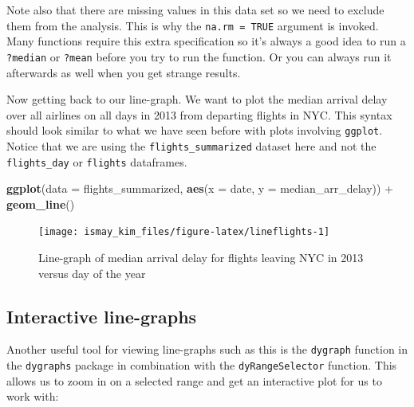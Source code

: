 \documentclass[]{tufte-book}
\newenvironment{Shaded}{\begin{snugshade}}{\end{snugshade}}
\newcommand{\KeywordTok}[1]{\textcolor[rgb]{0.13,0.29,0.53}{\textbf{{#1}}}}
\newcommand{\DataTypeTok}[1]{\textcolor[rgb]{0.13,0.29,0.53}{{#1}}}
\newcommand{\StringTok}[1]{\textcolor[rgb]{0.31,0.60,0.02}{{#1}}}
\newcommand{\NormalTok}[1]{{#1}}
\begin{document}
Note also that there are missing values in this data set so we need to
exclude them from the analysis. This is why the \texttt{na.rm\ =\ TRUE}
argument is invoked. Many functions require this extra specification so
it's always a good idea to run a \texttt{?median} or \texttt{?mean}
before you try to run the function. Or you can always run it afterwards
as well when you get strange results.

Now getting back to our line-graph. We want to plot the median arrival
delay over all airlines on all days in 2013 from departing flights in
NYC. This syntax should look similar to what we have seen before with
plots involving \texttt{ggplot}. Notice that we are using the
\texttt{flights\_summarized} dataset here and not the
\texttt{flights\_day} or \texttt{flights} dataframes.

\begin{Shaded}
\begin{Highlighting}[]
\KeywordTok{ggplot}\NormalTok{(}\DataTypeTok{data =} \NormalTok{flights_summarized, }\KeywordTok{aes}\NormalTok{(}\DataTypeTok{x =} \NormalTok{date, }\DataTypeTok{y =} \NormalTok{median_arr_delay)) +}
\StringTok{  }\KeywordTok{geom_line}\NormalTok{()}
\end{Highlighting}
\end{Shaded}

\begin{figure}
\texttt{[image: ismay\_kim\_files/figure-latex/lineflights-1]} \caption[Line-graph of median arrival delay for flights leaving NYC in 2013 versus day of the year]{Line-graph of median arrival delay for flights leaving NYC in 2013 versus day of the year}\label{fig:lineflights}
\end{figure}

\subsection{Interactive line-graphs}\label{interactive-line-graphs}

Another useful tool for viewing line-graphs such as this is the
\texttt{dygraph} function in the \texttt{dygraphs} package in
combination with the \texttt{dyRangeSelector} function. This allows us
to zoom in on a selected range and get an interactive plot for us to
work with:

\begin{Shaded}
\end{Shaded}
\end{document}
